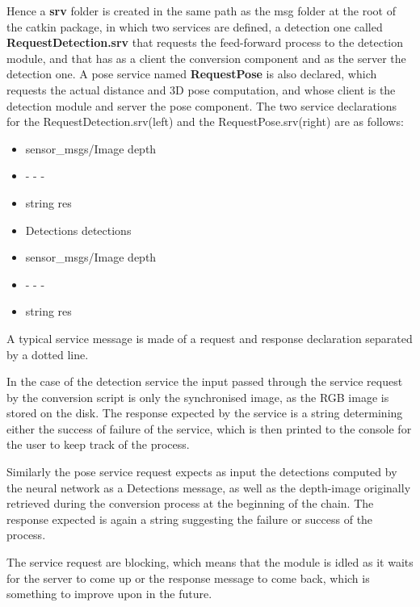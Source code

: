 Hence a \textbf{srv} folder is created in the same path as the msg folder at the root of the catkin package, in which two services are defined, a detection one called \textbf{RequestDetection.srv} that requests the feed-forward process to the detection module, and that has as a client the conversion component and as the server the detection one. A pose service named \textbf{RequestPose} is also declared, which requests the actual distance and 3D pose computation, and whose client is the detection module and server the pose component. The two service declarations for the RequestDetection.srv(left) and the RequestPose.srv(right) are as follows:

\begin{multicols}{2}
  \begin{itemize}
    \item sensor\_msgs/Image depth
    \item - - -
    \item string res
  \end{itemize}

  \columnbreak

  \begin{itemize}
    \item Detections detections
    \item sensor\_msgs/Image depth
    \item - - -
    \item string res
  \end{itemize}
\end{multicols}

A typical service message is made of a request and response declaration separated by a dotted line. 

In the case of the detection service the input passed through the service request by the conversion script is only the synchronised image, as the RGB image is stored on the disk. The response expected by the service is a string determining either the success of failure of the service, which is then printed to the console for the user to keep track of the process.

Similarly the pose service request expects as input the detections computed by the neural network as a Detections message, as well as the depth-image originally retrieved during the conversion process at the beginning of the chain. The response expected is again a string suggesting the failure or success of the process.

The service request are blocking, which means that the module is idled as it waits for the server to come up or the response message to come back, which is something to improve upon in the future.


